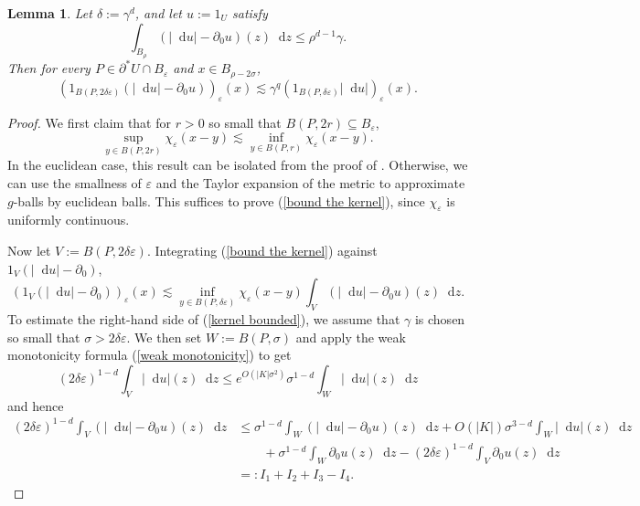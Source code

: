\documentclass[reqno,11pt]{amsart}
\newcommand*\dif{\mathop{}\!\mathrm{d}}
\newtheorem{lemma}[theorem]{Lemma}
\theoremstyle{definition}
\numberwithin{equation}{section}
\begin{document}
\begin{lemma}\label{mollifier sublemma}
Let $\delta := \gamma^d$, and let $u := 1_U$ satisfy
\begin{equation}\label{hypothesis on mollifier sublemma}
\int_{B_\rho} (|\dif u| - \partial_0 u)(z) \dif z \leq \rho^{d - 1} \gamma.
\end{equation}
Then for every $P \in \partial^* U \cap B_\varepsilon$ and $x \in B_{\rho - 2\sigma}$,
$$(1_{B(P, 2\delta\varepsilon)}(|\dif u| - \partial_0 u))_\varepsilon(x) \lesssim \gamma^q (1_{B(P, \delta\varepsilon)} |\dif u|)_\varepsilon(x).$$
\end{lemma}
\begin{proof}
We first claim that for $r > 0$ so small that $B(P, 2r) \subseteq B_\varepsilon$,
\begin{equation}\label{bound the kernel}
\sup_{y \in B(P, 2r)} \chi_\varepsilon(x - y) \lesssim \inf_{y \in B(P, r)} \chi_\varepsilon(x - y).
\end{equation}
In the euclidean case, this result can be isolated from the proof of \cite[Theorem 7.3]{Giusti77}.
Otherwise, we can use the smallness of $\varepsilon$ and the Taylor expansion of the metric to approximate $g$-balls by euclidean balls.
This suffices to prove (\ref{bound the kernel}), since $\chi_\varepsilon$ is uniformly continuous.

Now let $V := B(P, 2\delta\varepsilon)$.
Integrating (\ref{bound the kernel}) against $1_V(|\dif u| - \partial_0)$,
\begin{equation}\label{kernel bounded}
    (1_V(|\dif u| - \partial_0))_\varepsilon(x) \lesssim \inf_{y \in B(P, \delta\varepsilon)} \chi_\varepsilon(x - y) \int_V (|\dif u| - \partial_0 u)(z) \dif z.
\end{equation}
To estimate the right-hand side of (\ref{kernel bounded}), we assume that $\gamma$ is chosen so small that $\sigma > 2\delta\varepsilon$.
We then set $W := B(P, \sigma)$ and apply the weak monotonicity formula (\ref{weak monotonicity}) to get
$$(2\delta\varepsilon)^{1 - d} \int_V |\dif u|(z) \dif z \leq e^{O(|K| \sigma^2)} \sigma^{1 - d} \int_W |\dif u|(z) \dif z$$
and hence
\begin{align*}
(2\delta\varepsilon)^{1 - d} \int_V (|\dif u| - \partial_0 u)(z) \dif z
&\leq \sigma^{1 - d} \int_W (|\dif u| - \partial_0 u)(z) \dif z + O(|K|) \sigma^{3 - d} \int_W |\dif u|(z) \dif z \\
&\qquad + \sigma^{1 - d} \int_W \partial_0 u(z) \dif z - (2\delta\varepsilon)^{1 - d} \int_V \partial_0 u(z) \dif z\\
&=: I_1 + I_2 + I_3 - I_4.
\end{align*}


\end{proof}
\end{document}
